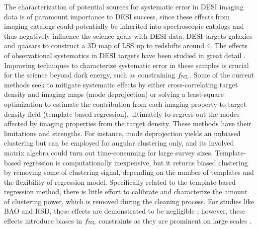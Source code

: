 The characterization of potential sources for systematic error in DESI imaging data is of paramount importance to DESI success, since these effects from imaging catalogs could potentially be inherited into spectroscopic catalogs and thus negatively influence the science goals with DESI data. DESI targets galaxies and quasars to construct a 3D map of LSS up to redshifts around 4. The effects of observational systematics in DESI targets have been studied in great detail \cite[see, e.g.,][]{kitanidis2020imaging, zhou2021clustering, chaussidon2022angular}. Improving techniques to characterize systematic error in these samples is crucial for the science beyond dark energy, such as constraining $f_{\rm NL}$. Some of the current methods seek to mitigate systematic effects by either cross-correlating target density and imaging maps (mode deprojection) or solving a least-square optimization to estimate the contribution from each imaging property to target density field (template-based regression), ultimately to regress out the modes affected by imaging properties from the target density. These methods have their limitations and strengths. For instance, mode deprojection yields an unbiased clustering but can be employed for angular clustering only, and its involved matrix algebra could turn out time-consuming for large survey sizes. Template-based regression is computationally inexpensive, but it returns biased clustering by removing some of clustering signal, depending on the number of templates and the flexibility of regression model. Specifically related to the template-based regression method, there is little effort to calibrate and characterize the amount of clustering power, which is removed during the cleaning process. For studies like BAO and RSD, these effects are demonstrated to be negligible \citep{merz2021clustering}; however, these effects introduce biases in $f_{\rm NL}$ constraints \citep{mueller2022primordial} as they are prominent on large scales \citep{rezaie2021primordial}.  
 
